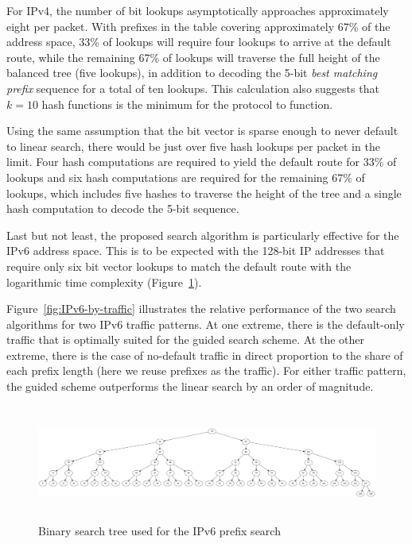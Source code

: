\documentclass[conference,compsoc]{IEEEtran}
\begin{document}
For IPv4, the number of bit lookups asymptotically approaches approximately 
eight per packet.
With prefixes in the table covering
approximately 67\% of the address space, 33\% of lookups will
require four lookups to arrive at the default route, while the remaining
67\% of lookups will
traverse the full height of the balanced tree (five lookups), in addition to
decoding the 5-bit \emph{best matching prefix} sequence for a total of
ten lookups. This calculation also suggests that $k=10$ hash functions
is the minimum for the protocol to function.

Using the same assumption that the bit vector is sparse enough to never
default to linear search, there would be just over five hash lookups per
packet in the 
limit. Four hash computations are required to yield the default route for
33\% of lookups and six hash computations are required
for the remaining 67\% of lookups, which includes five hashes to traverse 
the height of the tree and a single hash computation to decode 
the 5-bit sequence.

Last but not least, the proposed search algorithm is particularly effective
for the IPv6 address space. This is to be expected with the 128-bit IP
addresses that require only six bit vector lookups to match the default
route with the logarithmic time complexity (Figure~\ref{fig:IPv6-tree}).

Figure~\ref{fig:IPv6-by-traffic} illustrates the relative performance of
the two search algorithms for two IPv6 traffic patterns. 
At one extreme, there is the default-only
traffic that is optimally suited for the guided search scheme. At the other
extreme, there is the case of no-default traffic in direct proportion to
the share of each prefix length (here we reuse prefixes as the traffic).
For either traffic pattern, the guided scheme outperforms the linear 
search by an order of magnitude.





\clearpage
\begin{figure}[p]
\centering
\includegraphics[height=1.5in]{../img/ipv6_balanced_tree.png}
  \caption{Binary search tree used for the IPv6 prefix search}
\label{fig:IPv6-tree}
\end{figure}
\end{document}
